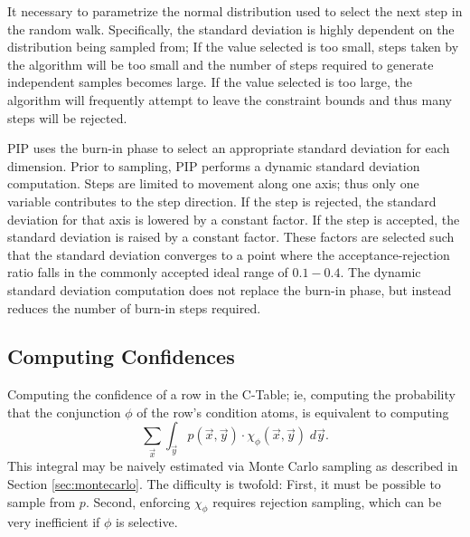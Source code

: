 It necessary to parametrize the normal distribution used to select the
next step in the random walk.  Specifically, the standard deviation is
highly dependent on the distribution being sampled from;  If the value selected is
too small,  steps taken  by the  algorithm will be  too small  and the
number  of  steps required  to  generate  independent samples  becomes
large.   If  the value  selected  is  too  large, the  algorithm  will
frequently attempt to leave the  constraint bounds and thus many steps
will be rejected.

PIP uses the burn-in phase to select an appropriate standard deviation
for  each  dimension.   Prior  to  sampling, PIP  performs  a  dynamic
standard deviation  computation.  Steps are limited  to movement along
one axis;  thus only one  variable contributes to the  step direction.
If  the step  is rejected,  the standard  deviation for  that  axis is
lowered by a  constant factor.  If the step  is accepted, the standard
deviation is raised by a  constant factor.  These factors are selected
such  that the  standard  deviation  converges to  a  point where  the
acceptance-rejection ratio falls in  the commonly accepted ideal range
of  $0.1-0.4$\cite{numericalrecipes}.  The  dynamic standard  deviation computation  does not
replace the burn-in  phase, but instead reduces the  number of burn-in
steps required.



\subsection{Computing Confidences}
\label{subsec:cint}


Computing the confidence of a row in the C-Table; ie, computing the 
probability that the conjunction $\phi$ of the row's condition atoms, 
is equivalent to computing
\[
\sum_{\vec{x}} \int_{\vec{y}} p(\vec{x}, \vec{y}) \cdot \chi_\phi(\vec{x},\vec{y}) \; d\vec{y}.
\]
This integral may be naively estimated via Monte Carlo sampling as
described in Section \ref{sec:montecarlo}.
The difficulty is twofold: First, it must be possible to sample from $p$.
Second, enforcing $\chi_\phi$ requires rejection sampling, which can be
very inefficient if $\phi$ is selective.




